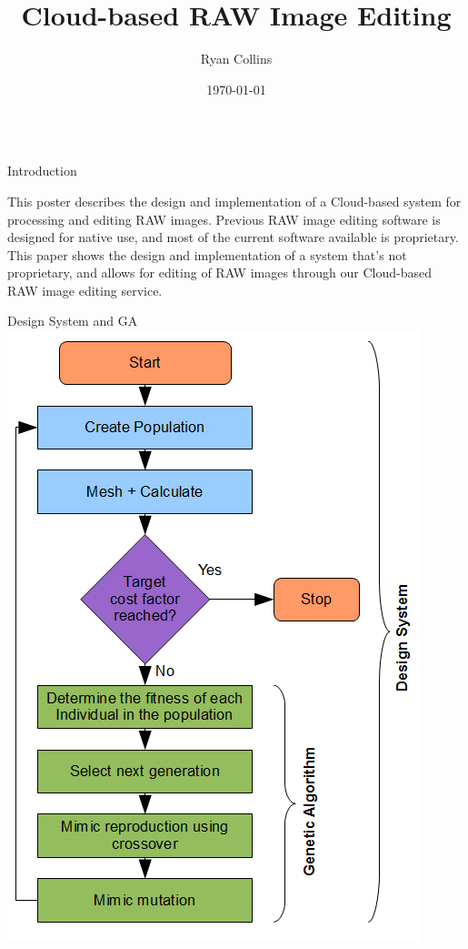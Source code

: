 \documentclass[final]{beamer}
\title[Final Year Project Poster]{Cloud-based RAW Image Editing}
\author[R Collins]{Ryan Collins}
\institute[Durham]{Department of Computer Science, Durham University}
\date{\today}
\begin{document}
  \begin{frame}{} 

  \vfill
    \begin{columns}[t]
      \begin{column}{.48\linewidth}
        \begin{block}{Introduction}

          This poster describes the design and implementation of
          a Cloud-based system for processing and editing RAW images.
          Previous RAW image editing software is designed for native
          use, and most of the current software available is proprietary.
          This paper shows the design and implementation of a system
          that's not proprietary, and allows for editing of RAW images
          through our Cloud-based RAW image editing service.

        \end{block}

       

        \begin{block}{Design System and GA}
          \includegraphics[width=\columnwidth]{DesignSystemandGA}  
        \end{block}
      \end{column}



\end{columns}
\end{frame}
\end{document}
